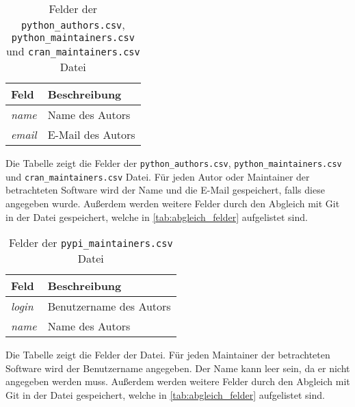 \begin{table}
    \centering
    \begin{tabularx}{\textwidth}{XL{10.2cm}}
        \toprule
        \textbf{Feld} & \textbf{Beschreibung} \\ \midrule
        \emph{name}   & Name des Autors       \\
        \emph{email}  & E-Mail des Autors     \\
        \bottomrule
    \end{tabularx}
    \caption{Felder der \texttt{python\_authors.csv}, \texttt{python\_maintainers.csv} und \texttt{cran\_maintainers.csv} Datei}
    \label{tab:python_authors}
    \small
    \raggedright
    Die Tabelle zeigt die Felder der \texttt{python\_authors.csv}, \texttt{python\_maintainers.csv} und \texttt{cran\_maintainers.csv} Datei. Für jeden Autor oder Maintainer der betrachteten Software wird der Name und die E-Mail gespeichert, falls diese angegeben wurde. Außerdem werden weitere Felder durch den Abgleich mit Git in der Datei gespeichert, welche in \autoref{tab:abgleich_felder} aufgelistet sind.
\end{table}

\begin{table}
    \centering
    \begin{tabularx}{\textwidth}{XL{10.2cm}}
        \toprule
        \textbf{Feld} & \textbf{Beschreibung}   \\ \midrule
        \emph{login}  & Benutzername des Autors \\
        \emph{name}   & Name des Autors         \\
        \bottomrule
    \end{tabularx}
    \caption{Felder der \texttt{pypi\_maintainers.csv} Datei}
    \label{tab:pypi_maintainers}
    \small
    \raggedright
    Die Tabelle zeigt die Felder der  Datei. Für jeden Maintainer der betrachteten Software wird der Benutzername angegeben. Der Name kann leer sein, da er nicht angegeben werden muss. Außerdem werden weitere Felder durch den Abgleich mit Git in der Datei gespeichert, welche in \autoref{tab:abgleich_felder} aufgelistet sind.
\end{table}

